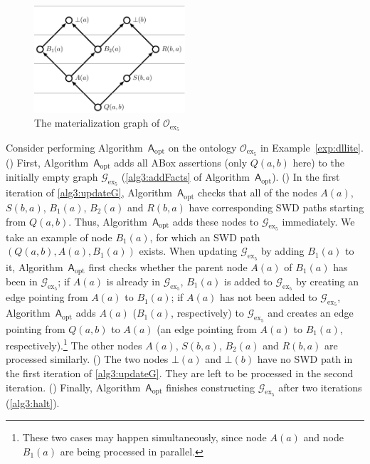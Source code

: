 \begin{figure}[htbp]
\begin{center}
\includegraphics[width=0.5\textwidth]{fig-dllite.pdf}
\caption{The materialization graph of $\mathcal{O}_{\text{ex}_5}$}
\label{fig:ex2}
\end{center}
\end{figure}

Consider performing Algorithm~$\mathsf{A}_{\text{opt}}$ on the ontology $\mathcal{O}_{\text{ex}_5}$ in Example~\ref{exp:dllite}.
(\uppercase\expandafter{}) First, Algorithm~$\mathsf{A}_{\text{opt}}$ adds all ABox assertions (only $Q(a,b)$ here)
to the initially empty graph $\mathcal{G}_{\text{ex}_5}$ (\ref{alg3:addFacts} of Algorithm~$\mathsf{A}_{\text{opt}}$).
(\uppercase\expandafter{}) In the first iteration of
\ref{alg3:updateG}, Algorithm~$\mathsf{A}_{\text{opt}}$ checks that all of the nodes
$A(a)$, $S(b,a)$, $B_1(a)$, $B_2(a)$ and $R(b,a)$ have corresponding SWD paths
starting from $Q(a,b)$. Thus, Algorithm~$\mathsf{A}_{\text{opt}}$
adds these nodes to $\mathcal{G}_{\text{ex}_5}$ immediately. We take an example of node $B_1(a)$,
for which an SWD path $(Q(a,b),A(a),B_1(a))$ exists.
When updating $\mathcal{G}_{\text{ex}_5}$ by adding $B_1(a)$ to it,
Algorithm~$\mathsf{A}_{\text{opt}}$ first checks whether the parent node $A(a)$ of $B_1(a)$
has been in $\mathcal{G}_{\text{ex}_5}$; if $A(a)$ is already in $\mathcal{G}_{\text{ex}_5}$, $B_1(a)$
is added to $\mathcal{G}_{\text{ex}_5}$ by creating an edge pointing from $A(a)$ to $B_1(a)$;
if $A(a)$ has not been added to $\mathcal{G}_{\text{ex}_5}$,
Algorithm~$\mathsf{A}_{\text{opt}}$ adds $A(a)$ ($B_1(a)$, respectively)
to $\mathcal{G}_{\text{ex}_5}$ and creates an edge pointing from
$Q(a,b)$ to $A(a)$ (an edge pointing from $A(a)$ to $B_1(a)$, respectively).\footnote{These two cases may happen simultaneously,
since node $A(a)$ and node $B_1(a)$ are being processed in parallel.} The other nodes
$A(a)$, $S(b,a)$, $B_2(a)$ and $R(b,a)$ are processed similarly.
(\uppercase\expandafter{})
The two nodes $\bot(a)$ and $\bot(b)$
have no SWD path in the first iteration of \ref{alg3:updateG}.
They are left to be processed in the second iteration.
(\uppercase\expandafter{})
Finally, Algorithm~$\mathsf{A}_{\text{opt}}$ finishes constructing $\mathcal{G}_{\text{ex}_5}$
after two iterations (\ref{alg3:halt}).

